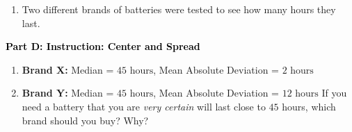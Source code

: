 \documentclass[12pt, letterpaper, fleqn]{article}
\newcommand{\blank}{\underline{\hspace{2.2cm}}}
\begin{document}
\vspace{3mm}

\begin{enumerate}[itemsep=2.2cm, leftmargin=0.6cm, resume]
\begin{itemize}
\item \textbf{Afternoon Class:} Mean = $74\%$, Range = $10\%$
\end{itemize}
\textbf{A.} Which class did better overall on average? \blank \\
\textbf{B.} Which class had more consistent (less spread out) scores? \blank
\item Two different brands of batteries were tested to see how many hours they last.
\end{enumerate}

\newpage

\begin{tcolorbox}[colback=customteal!20]
\large\textcolor{black}{\textbf{Part D: Instruction: Center and Spread}}
\end{tcolorbox}

\vspace{3mm}

\begin{enumerate}[itemsep=2.2cm, leftmargin=0.6cm, resume]
\item \textbf{Brand X:} Median = $45\text{ hours}$, Mean Absolute Deviation = $2\text{ hours}$
\item \textbf{Brand Y:} Median = $45\text{ hours}$, Mean Absolute Deviation = $12\text{ hours}$
If you need a battery that you are \textit{very certain} will last close to $45$ hours, which brand should you buy? Why?
\end{enumerate}
\end{document}
